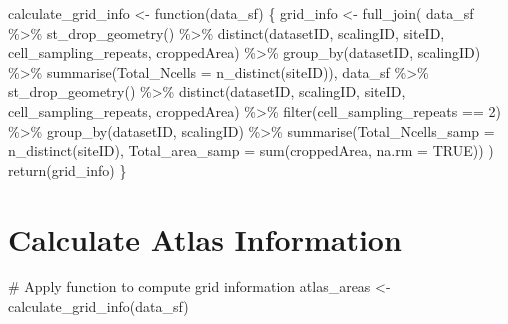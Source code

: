 \documentclass[
  letterpaper,
  DIV=11,
  numbers=noendperiod]{scrreprt}
\newenvironment{Shaded}{\begin{snugshade}}{\end{snugshade}}
\newcommand{\AttributeTok}[1]{\textcolor[rgb]{0.40,0.45,0.13}{#1}}
\newcommand{\CommentTok}[1]{\textcolor[rgb]{0.37,0.37,0.37}{#1}}
\newcommand{\ConstantTok}[1]{\textcolor[rgb]{0.56,0.35,0.01}{#1}}
\newcommand{\ControlFlowTok}[1]{\textcolor[rgb]{0.00,0.23,0.31}{#1}}
\newcommand{\DecValTok}[1]{\textcolor[rgb]{0.68,0.00,0.00}{#1}}
\newcommand{\FunctionTok}[1]{\textcolor[rgb]{0.28,0.35,0.67}{#1}}
\newcommand{\NormalTok}[1]{\textcolor[rgb]{0.00,0.23,0.31}{#1}}
\newcommand{\OtherTok}[1]{\textcolor[rgb]{0.00,0.23,0.31}{#1}}
\newcommand{\SpecialCharTok}[1]{\textcolor[rgb]{0.37,0.37,0.37}{#1}}
\begin{document}
\begin{Shaded}
\begin{Highlighting}[]
\NormalTok{calculate\_grid\_info }\OtherTok{\textless{}{-}} \ControlFlowTok{function}\NormalTok{(data\_sf) \{}
\NormalTok{  grid\_info }\OtherTok{\textless{}{-}} \FunctionTok{full\_join}\NormalTok{(}
\NormalTok{    data\_sf }\SpecialCharTok{\%\textgreater{}\%}
      \FunctionTok{st\_drop\_geometry}\NormalTok{() }\SpecialCharTok{\%\textgreater{}\%}
      \FunctionTok{distinct}\NormalTok{(datasetID, scalingID, siteID, cell\_sampling\_repeats, croppedArea) }\SpecialCharTok{\%\textgreater{}\%}
      \FunctionTok{group\_by}\NormalTok{(datasetID, scalingID) }\SpecialCharTok{\%\textgreater{}\%}
      \FunctionTok{summarise}\NormalTok{(}\AttributeTok{Total\_Ncells =} \FunctionTok{n\_distinct}\NormalTok{(siteID)),}
\NormalTok{    data\_sf }\SpecialCharTok{\%\textgreater{}\%}
      \FunctionTok{st\_drop\_geometry}\NormalTok{() }\SpecialCharTok{\%\textgreater{}\%}
      \FunctionTok{distinct}\NormalTok{(datasetID, scalingID, siteID, cell\_sampling\_repeats, croppedArea) }\SpecialCharTok{\%\textgreater{}\%}
      \FunctionTok{filter}\NormalTok{(cell\_sampling\_repeats }\SpecialCharTok{==} \DecValTok{2}\NormalTok{) }\SpecialCharTok{\%\textgreater{}\%}
      \FunctionTok{group\_by}\NormalTok{(datasetID, scalingID) }\SpecialCharTok{\%\textgreater{}\%}
      \FunctionTok{summarise}\NormalTok{(}\AttributeTok{Total\_Ncells\_samp =} \FunctionTok{n\_distinct}\NormalTok{(siteID), }\AttributeTok{Total\_area\_samp =} \FunctionTok{sum}\NormalTok{(croppedArea, }\AttributeTok{na.rm =} \ConstantTok{TRUE}\NormalTok{))}
\NormalTok{  )}
  \FunctionTok{return}\NormalTok{(grid\_info)}
\NormalTok{\}}
\end{Highlighting}
\end{Shaded}

\hypertarget{calculate-atlas-information-1}{%
\section{Calculate Atlas
Information}\label{calculate-atlas-information-1}}

\begin{Shaded}
\begin{Highlighting}[]
\CommentTok{\# Apply function to compute grid information}
\NormalTok{atlas\_areas }\OtherTok{\textless{}{-}} \FunctionTok{calculate\_grid\_info}\NormalTok{(data\_sf)}
\end{Highlighting}
\end{Shaded}
\end{document}
